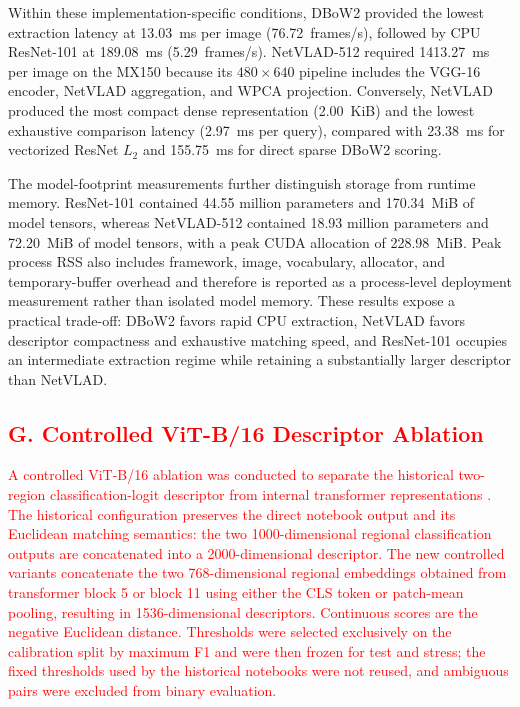 \documentclass{ieeeaccess}
\begin{document}
{Within these implementation-specific conditions, DBoW2 provided the lowest extraction latency at 13.03~ms per image (76.72~frames/s), followed by CPU ResNet-101 at 189.08~ms (5.29~frames/s). NetVLAD-512 required 1413.27~ms per image on the MX150 because its $480\times640$ pipeline includes the VGG-16 encoder, NetVLAD aggregation, and WPCA projection. Conversely, NetVLAD produced the most compact dense representation (2.00~KiB) and the lowest exhaustive comparison latency (2.97~ms per query), compared with 23.38~ms for vectorized ResNet $L_2$ and 155.75~ms for direct sparse DBoW2 scoring.

The model-footprint measurements further distinguish storage from runtime memory. ResNet-101 contained 44.55 million parameters and 170.34~MiB of model tensors, whereas NetVLAD-512 contained 18.93 million parameters and 72.20~MiB of model tensors, with a peak CUDA allocation of 228.98~MiB. Peak process RSS also includes framework, image, vocabulary, allocator, and temporary-buffer overhead and therefore is reported as a process-level deployment measurement rather than isolated model memory. These results expose a practical trade-off: DBoW2 favors rapid CPU extraction, NetVLAD favors descriptor compactness and exhaustive matching speed, and ResNet-101 occupies an intermediate extraction regime while retaining a substantially larger descriptor than NetVLAD.
}


\subsection{\textcolor{red}{G. Controlled ViT-B/16 Descriptor Ablation}}

\textcolor{red}{A controlled ViT-B/16 ablation was conducted to separate the historical two-region classification-logit descriptor from internal transformer representations \cite{Dosovitskiy2021ViT}. The historical configuration preserves the direct notebook output and its Euclidean matching semantics: the two 1000-dimensional regional classification outputs are concatenated into a 2000-dimensional descriptor. The new controlled variants concatenate the two 768-dimensional regional embeddings obtained from transformer block 5 or block 11 using either the CLS token or patch-mean pooling, resulting in 1536-dimensional descriptors. Continuous scores are the negative Euclidean distance. Thresholds were selected exclusively on the calibration split by maximum F1 and were then frozen for test and stress; the fixed thresholds used by the historical notebooks were not reused, and ambiguous pairs were excluded from binary evaluation.}
\end{document}
